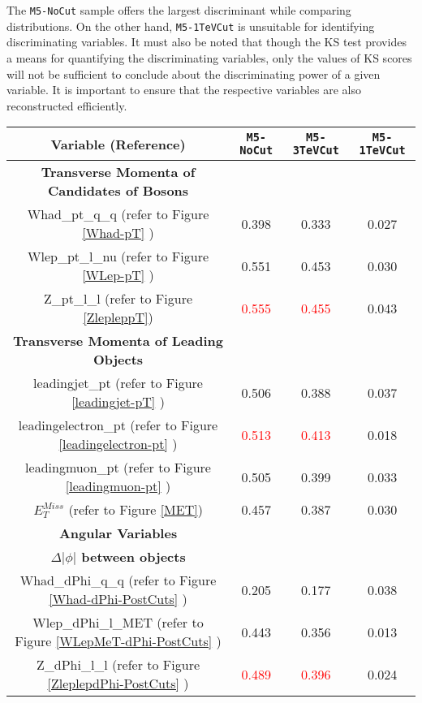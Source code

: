 The \texttt{M5-NoCut} sample offers the largest discriminant while comparing distributions. On the other hand, \texttt{M5-1TeVCut} is unsuitable for identifying discriminating variables. It must also be noted that though the KS test provides a means for quantifying the discriminating variables, only the values of KS scores will not be sufficient to conclude about the discriminating power of a given variable. It is important to ensure that the respective variables are also reconstructed efficiently.  

\begin{table}
		\centering
	\begin{tabular}{|c|c|c|c|}
		\hline
		Variable (Reference) &\texttt{M5-NoCut}&\texttt{M5-3TeVCut}&\texttt{M5-1TeVCut} \\
		\hline 
		\hline
		\textbf{Transverse Momenta of Candidates of Bosons}   &  && \\
		\hline
		Whad\_pt\_q\_q (refer to Figure  \ref{Whad-pT} ) & 0.398 & 0.333&0.027 \\
		\hline
		Wlep\_pt\_l\_nu   (refer to Figure  \ref{WLep-pT} ) & 0.551 & 0.453&0.030  \\
		\hline
		Z\_pt\_l\_l  (refer to Figure  \ref{ZlepleppT})  &\textcolor{red}{0.555} & \textcolor{red}{0.455} & 0.043 \\
		\hline
		\textbf{ Transverse Momenta of Leading Objects} &      &&\\
		\hline
		leadingjet\_pt (refer to Figure  \ref{leadingjet-pT} )& 0.506 &0.388 & 0.037  \\
		\hline
		leadingelectron\_pt (refer to Figure  \ref{leadingelectron-pt} ) & \textcolor{red}{0.513} &  \textcolor{red}{0.413} &0.018 \\
		\hline
		leadingmuon\_pt  (refer to Figure  \ref{leadingmuon-pt} ) & 0.505 & 0.399 & 0.033 \\
		\hline
		\textbf{ $E^{Miss}_{T}$} (refer to Figure \ref{MET}) & 0.457 & 0.387& 0.030  \\
		\hline
		\textbf{Angular Variables}  &    && \\
		\hline
		\textbf{$\Delta|\phi|$ between objects}   &  && \\
		\hline
		Whad\_dPhi\_q\_q  (refer to Figure  \ref{Whad-dPhi-PostCuts} ) & 0.205 & 0.177&0.038  \\
		\hline
		Wlep\_dPhi\_l\_MET (refer to Figure  \ref{WLepMeT-dPhi-PostCuts} )& 0.443 & 0.356&0.013 \\
		\hline
		Z\_dPhi\_l\_l  (refer to Figure  \ref{ZleplepdPhi-PostCuts} )& \textcolor{red}{0.489} & \textcolor{red}{0.396} & 0.024 \\

\end{tabular}
\end{table}
